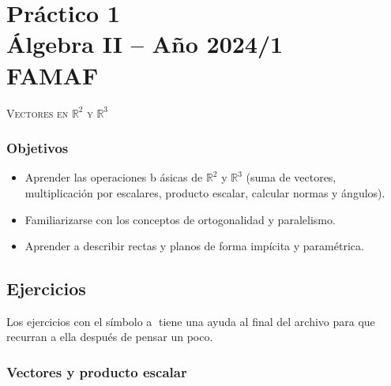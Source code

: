 \chapter*{Práctico 1 \\ Álgebra  II -- Año 2024/1 \\ FAMAF}\label{practico-1}
    
    
\bigbreak


\centerline{\textsc{Vectores en $\mathbb R^2$ y $\mathbb R^3$}}


\bigbreak

\subsection*{Objetivos}

\begin{itemize}
 \item Aprender las operaciones b ásicas de $\mathbb R^2$ y $\mathbb R^3$ (suma de vectores, multiplicación por escalares, producto escalar, calcular normas y  ángulos).
 \item Familiarizarse con los conceptos de ortogonalidad y paralelismo.
 \item Aprender a describir rectas y planos de forma impícita y paramétrica.
\end{itemize}


\section*{Ejercicios}

Los ejercicios con el símbolo \textcircled{a} tiene una ayuda al final del archivo para que recurran a ella después de pensar un poco.


\subsection*{Vectores y producto escalar}


